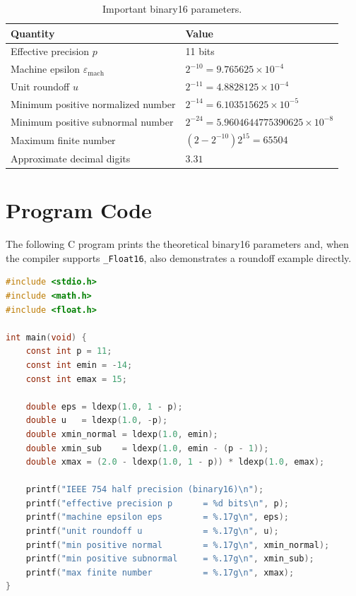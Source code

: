 \documentclass[12pt,a4paper]{article}
\begin{document}
\begin{table}[H]
\centering
\caption{Important binary16 parameters.}
\begin{tabular}{ll}
\toprule
Quantity & Value \\
\midrule
Effective precision $p$ & 11 bits \\
Machine epsilon $\varepsilon_{\mathrm{mach}}$ & $2^{-10}=9.765625\times10^{-4}$ \\
Unit roundoff $u$ & $2^{-11}=4.8828125\times10^{-4}$ \\
Minimum positive normalized number & $2^{-14}=6.103515625\times10^{-5}$ \\
Minimum positive subnormal number & $2^{-24}=5.9604644775390625\times10^{-8}$ \\
Maximum finite number & $(2-2^{-10})2^{15}=65504$ \\
Approximate decimal digits & $3.31$ \\
\bottomrule
\end{tabular}
\end{table}

\section{Program Code}

The following C program prints the theoretical binary16 parameters and, when the compiler supports \texttt{\_Float16}, also demonstrates a roundoff example directly.

\begin{lstlisting}[language=C]
#include <stdio.h>
#include <math.h>
#include <float.h>

int main(void) {
    const int p = 11;
    const int emin = -14;
    const int emax = 15;

    double eps = ldexp(1.0, 1 - p);
    double u   = ldexp(1.0, -p);
    double xmin_normal = ldexp(1.0, emin);
    double xmin_sub    = ldexp(1.0, emin - (p - 1));
    double xmax = (2.0 - ldexp(1.0, 1 - p)) * ldexp(1.0, emax);

    printf("IEEE 754 half precision (binary16)\n");
    printf("effective precision p      = %d bits\n", p);
    printf("machine epsilon eps        = %.17g\n", eps);
    printf("unit roundoff u            = %.17g\n", u);
    printf("min positive normal        = %.17g\n", xmin_normal);
    printf("min positive subnormal     = %.17g\n", xmin_sub);
    printf("max finite number          = %.17g\n", xmax);
}
\end{lstlisting}
\end{document}
